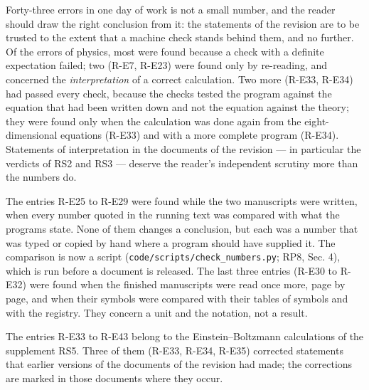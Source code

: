 \documentclass[
  10pt,
]{article}
\begin{document}
Forty-three errors in one day of work is not a small number, and the
reader should draw the right conclusion from it: the statements of the
revision are to be trusted to the extent that a machine check stands
behind them, and no further. Of the errors of physics, most were found
because a check with a definite expectation failed; two (R-E7, R-E23)
were found only by re-reading, and concerned the \emph{interpretation}
of a correct calculation. Two more (R-E33, R-E34) had passed every
check, because the checks tested the program against the equation that
had been written down and not the equation against the theory; they were
found only when the calculation was done again from the
eight-dimensional equations (R-E33) and with a more complete program
(R-E34). Statements of interpretation in the documents of the revision
--- in particular the verdicts of RS2 and RS3 --- deserve the reader's
independent scrutiny more than the numbers do.

The entries R-E25 to R-E29 were found while the two manuscripts were
written, when every number quoted in the running text was compared with
what the programs state. None of them changes a conclusion, but each was
a number that was typed or copied by hand where a program should have
supplied it. The comparison is now a script
(\texttt{code/scripts/check\_numbers.py}; RP8, Sec. 4), which is run
before a document is released. The last three entries (R-E30 to R-E32)
were found when the finished manuscripts were read once more, page by
page, and when their symbols were compared with their tables of symbols
and with the registry. They concern a unit and the notation, not a
result.

The entries R-E33 to R-E43 belong to the Einstein--Boltzmann
calculations of the supplement RS5. Three of them (R-E33, R-E34, R-E35)
corrected statements that earlier versions of the documents of the
revision had made; the corrections are marked in those documents where
they occur.
\end{document}
